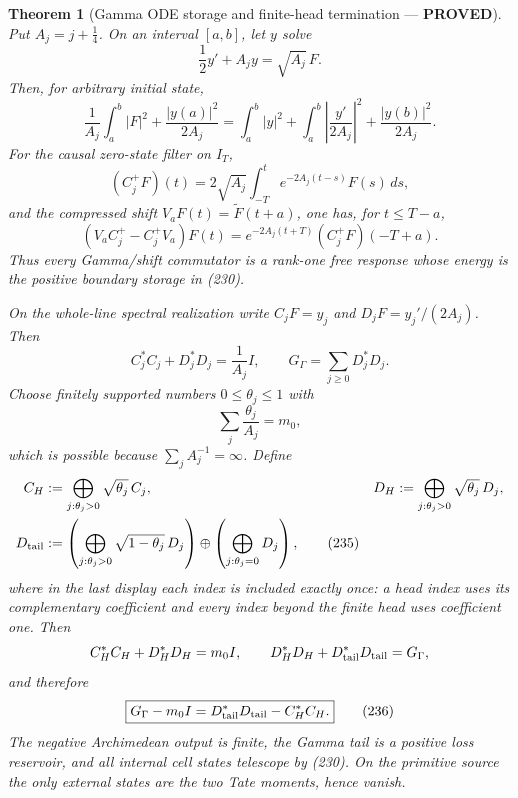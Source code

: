 \documentclass[11pt]{article}
\newtheorem{theorem}{Theorem}
\newcommand{\PROVED}{\textcolor{green!45!black}{\textbf{PROVED}}}
\begin{document}
\begin{theorem}[Gamma ODE storage and finite-head termination --- \PROVED]
Put $A_j=j+\tfrac14$.  On an interval $[a,b]$, let $y$ solve
\begin{equation}
 \frac12y'+A_jy=\sqrt{A_j}\,F.                        \tag{229}
\end{equation}
Then, for arbitrary initial state,
\begin{equation}
 \frac1{A_j}\int_a^b|F|^2+\frac{|y(a)|^2}{2A_j}
 =\int_a^b|y|^2+
  \int_a^b\left|\frac{y'}{2A_j}\right|^2
  +\frac{|y(b)|^2}{2A_j}.                             \tag{230}
\end{equation}
For the causal zero-state filter on $I_T$,
\begin{equation}
 (C_j^+F)(t)=2\sqrt{A_j}\int_{-T}^t
 e^{-2A_j(t-s)}F(s)\,ds,                              \tag{231}
\end{equation}
and the compressed shift $V_aF(t)=\widetilde F(t+a)$, one has, for
$t\le T-a$,
\begin{equation}
 (V_aC_j^+-C_j^+V_a)F(t)
 =e^{-2A_j(t+T)}(C_j^+F)(-T+a).                       \tag{232}
\end{equation}
Thus every Gamma/shift commutator is a rank-one free response whose energy is
the positive boundary storage in (230).

On the whole-line spectral realization write $C_jF=y_j$ and
$D_jF=y_j'/(2A_j)$.  Then
\begin{equation}
 C_j^*C_j+D_j^*D_j=\frac1{A_j}I,
 \qquad
 G_\Gamma=\sum_{j\ge0}D_j^*D_j.                      \tag{233}
\end{equation}
Choose finitely supported numbers $0\le\theta_j\le1$ with
\begin{equation}
 \sum_j\frac{\theta_j}{A_j}=m_0,                     \tag{234}
\end{equation}
which is possible because $\sum_jA_j^{-1}=\infty$.  Define
\begin{align}
 C_H&:=\bigoplus_{j:\theta_j>0}\sqrt{\theta_j}\,C_j,
 &D_H&:=\bigoplus_{j:\theta_j>0}\sqrt{\theta_j}\,D_j,\notag\\
 D_{\rm tail}&:=\left(\bigoplus_{j:\theta_j>0}
                   \sqrt{1-\theta_j}\,D_j\right)
       \oplus\left(\bigoplus_{j:\theta_j=0}D_j\right), \tag{235}
\end{align}
where in the last display each index is included exactly once: a head index
uses its complementary coefficient and every index beyond the finite head
uses coefficient one.  Then
\begin{equation}
 C_H^*C_H+D_H^*D_H=m_0I,
 \qquad
 D_H^*D_H+D_{\rm tail}^*D_{\rm tail}=G_\Gamma,
\end{equation}
and therefore
\begin{equation}
 \boxed{G_\Gamma-m_0I=D_{\rm tail}^*D_{\rm tail}-C_H^*C_H.} \tag{236}
\end{equation}
The negative Archimedean output is finite, the Gamma tail is a positive loss
reservoir, and all internal cell states telescope by (230).  On the primitive
source the only external states are the two Tate moments, hence vanish.
\end{theorem}
\end{document}
